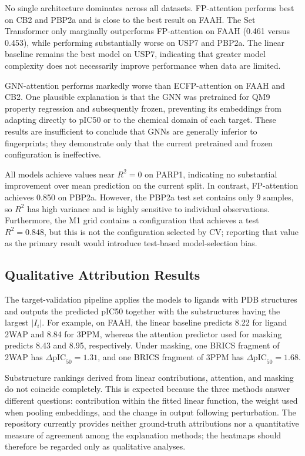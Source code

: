 No single architecture dominates across all datasets. FP-attention performs best
on CB2 and PBP2a and is close to the best result on FAAH. The Set Transformer
only marginally outperforms FP-attention on FAAH (0.461 versus 0.453), while
performing substantially worse on USP7 and PBP2a. The linear baseline remains
the best model on USP7, indicating that greater model complexity does not
necessarily improve performance when data are limited.

GNN-attention performs markedly worse than ECFP-attention on FAAH and CB2. One
plausible explanation is that the GNN was pretrained for QM9 property regression
and subsequently frozen, preventing its embeddings from adapting directly to
pIC50 or to the chemical domain of each target. These results are insufficient
to conclude that GNNs are generally inferior to fingerprints; they demonstrate
only that the current pretrained and frozen configuration is ineffective.

All models achieve values near \(R^2=0\) on PARP1, indicating no substantial
improvement over mean prediction on the current split. In contrast,
FP-attention achieves 0.850 on PBP2a. However, the PBP2a test set contains only
9 samples, so \(R^2\) has high variance and is highly sensitive to individual
observations. Furthermore, the M1 grid contains a configuration that achieves a
test \(R^2=0.848\), but this is not the configuration selected by CV; reporting
that value as the primary result would introduce test-based model-selection
bias.

\subsection{Qualitative Attribution Results}

The target-validation pipeline applies the models to ligands with PDB structures
and outputs the predicted pIC50 together with the substructures having the
largest \(|I_i|\). For example, on FAAH, the linear baseline predicts 8.22 for
ligand 2WAP and 8.84 for 3PPM, whereas the attention predictor used for masking
predicts 8.43 and 8.95, respectively. Under masking, one BRICS fragment of 2WAP
has \(\Delta\mathrm{pIC}_{50}=1.31\), and one BRICS fragment of 3PPM has
\(\Delta\mathrm{pIC}_{50}=1.68\).

Substructure rankings derived from linear contributions, attention, and masking
do not coincide completely. This is expected because the three methods answer
different questions: contribution within the fitted linear function, the weight
used when pooling embeddings, and the change in output following perturbation.
The repository currently provides neither ground-truth attributions nor a
quantitative measure of agreement among the explanation methods; the heatmaps
should therefore be regarded only as qualitative analyses.

